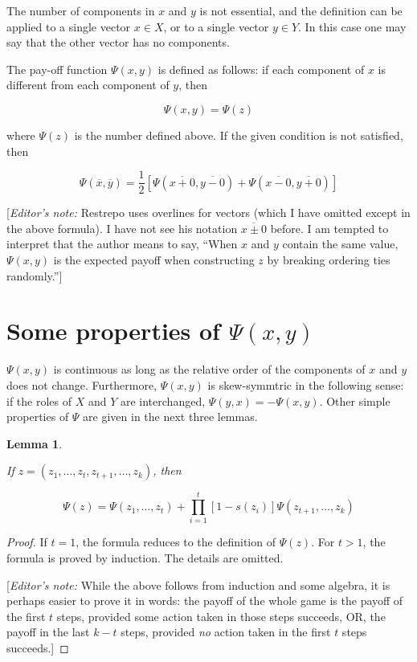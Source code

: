 \documentclass{article}
\newtheorem{lemma}{Lemma}
\begin{document}
The number of components in $x$ and $y$ is not essential, and the definition
can be applied to a single vector $x \in X$, or to a single vector $y \in Y$.
In this case one may say that the other vector has no components.

The pay-off function $\Psi(x, y)$ is defined as follows: if each component
of $x$ is different from each component of $y$, then

\[
    \Psi(x, y) = \Psi(z)
\]

where $\Psi(z)$ is the number defined above. If the given condition is not
satisfied, then

\[
    \Psi(\overline{x}, \overline{y}) = \frac{1}{2}
    [\Psi(\overline{x + 0}, \overline{y - 0}) +
    \Psi(\overline{x - 0}, \overline{y + 0})
    ]
\]

[\emph{Editor's note:} Restrepo uses overlines for vectors (which I have omitted
except in the above formula). I have not see his notation $\overline{x \pm 0}$
before. I am tempted to interpret that the author means to say, ``When $x$ and
$y$ contain the same value, $\Psi(x,y)$ is the expected payoff when
constructing $z$ by breaking ordering ties randomly.'']

\section{Some properties of $\Psi(x, y)$}

$\Psi(x, y)$ is continuous as long as the relative order of the components of
$x$ and $y$ does not change. Furthermore, $\Psi(x, y)$ is skew-symmtric in the
following sense: if the roles of $X$ and $Y$ are interchanged, $\Psi(y, x) =
-\Psi(x, y)$. Other simple properties of $\Psi$ are given in the next three
lemmas.

\begin{lemma} \label{lemma:psi-recursive}

If $z = (z_1, \dots, z_t, z_{t+1}, \dots, z_k)$, then

\[
\Psi(z) = \Psi(z_1, \dots, z_t) +
\prod_{i=1}^t [1-s(z_i)] \Psi(z_{t+1}, \dots, z_k)
\]

\end{lemma}

\begin{proof}

If $t = 1$, the formula reduces to the definition of $\Psi(z)$. For $t > 1$,
the formula is proved by induction. The details are omitted.

[\emph{Editor's note:} While the above follows from induction and some algebra,
it is perhaps easier to prove it in words: the payoff of the whole game is the
payoff of the first $t$ steps, provided some action taken in those steps
succeeds, OR, the payoff in the last $k - t$ steps, provided \emph{no} action
taken in the first $t$ steps succeeds.]

\end{proof}
\end{document}
